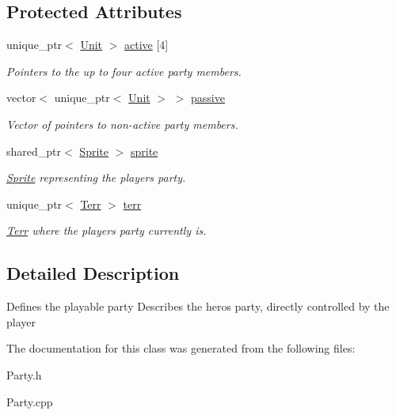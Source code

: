 \subsection*{Protected Attributes}
\begin{DoxyCompactItemize}
\item 
unique\+\_\+ptr$<$ \hyperlink{class_unit}{Unit} $>$ \hyperlink{class_party_aec6e42afb906b261b4d367922a1c0d33}{active} \mbox{[}4\mbox{]}\hypertarget{class_party_aec6e42afb906b261b4d367922a1c0d33}{}\label{class_party_aec6e42afb906b261b4d367922a1c0d33}

\begin{DoxyCompactList}\small\item\em Pointers to the up to four active party members. \end{DoxyCompactList}\item 
vector$<$ unique\+\_\+ptr$<$ \hyperlink{class_unit}{Unit} $>$ $>$ \hyperlink{class_party_a6dd68ad949efb33afd401d26de7ba2a4}{passive}\hypertarget{class_party_a6dd68ad949efb33afd401d26de7ba2a4}{}\label{class_party_a6dd68ad949efb33afd401d26de7ba2a4}

\begin{DoxyCompactList}\small\item\em Vector of pointers to non-\/active party members. \end{DoxyCompactList}\item 
shared\+\_\+ptr$<$ \hyperlink{class_sprite}{Sprite} $>$ \hyperlink{class_party_ae063baa6bfa6fe247ade34a135eb3552}{sprite}\hypertarget{class_party_ae063baa6bfa6fe247ade34a135eb3552}{}\label{class_party_ae063baa6bfa6fe247ade34a135eb3552}

\begin{DoxyCompactList}\small\item\em \hyperlink{class_sprite}{Sprite} representing the player\textquotesingle{}s party. \end{DoxyCompactList}\item 
unique\+\_\+ptr$<$ \hyperlink{class_terr}{Terr} $>$ \hyperlink{class_party_a50fdc449d05dd04c217ebb380e98a955}{terr}\hypertarget{class_party_a50fdc449d05dd04c217ebb380e98a955}{}\label{class_party_a50fdc449d05dd04c217ebb380e98a955}

\begin{DoxyCompactList}\small\item\em \hyperlink{class_terr}{Terr} where the player\textquotesingle{}s party currently is. \end{DoxyCompactList}\end{DoxyCompactItemize}


\subsection{Detailed Description}
Defines the playable party Describes the hero\textquotesingle{}s party, directly controlled by the player 

The documentation for this class was generated from the following files\+:\begin{DoxyCompactItemize}
\item 
Party.\+h\item 
Party.\+cpp\end{DoxyCompactItemize}

